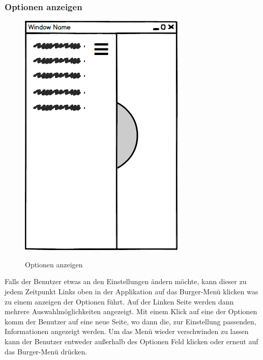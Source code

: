 \subsubsection{Optionen anzeigen}
\begin{figure}[H]
	\centering
	\includegraphics[width=.7\linewidth]{pictures/Desktop/Options.png}\
	\caption{Optionen anzeigen}
\end{figure}
Falls der Benutzer etwas an den Einstellungen ändern möchte, kann dieser zu jedem Zeitpunkt Links oben in der Applikation auf das Burger-Menü klicken was zu einem anzeigen der Optionen führt. Auf der Linken Seite werden dann mehrere Auswahlmöglichkeiten angezeigt. Mit einem Klick auf eine der Optionen komm der Benutzer auf eine neue Seite, wo dann die, zur Einstellung passenden, Informationen angezeigt werden. Um das Menü wieder verschwinden zu lassen kann der Benutzer entweder außerhalb des Optionen Feld klicken oder erneut auf das Burger-Menü drücken. 
